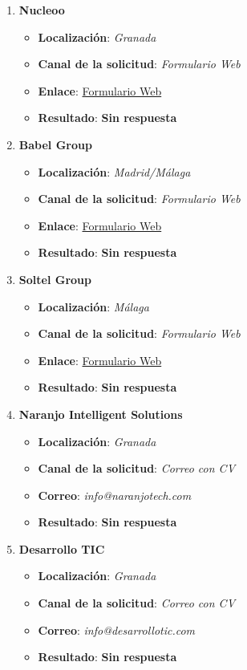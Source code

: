 \begin{enumerate}
	\item \textbf{Nucleoo}
	\begin{itemize}
		\item \textbf{Localización}: \textit{Granada}
		\item \textbf{Canal de la solicitud}: \textit{Formulario Web}
		\item \textbf{Enlace}: \href{https://nucleoo.factorialhr.es/apply}{Formulario Web}
		\item \textbf{Resultado}: {\color{orange} \textbf{Sin respuesta}}
	\end{itemize}
	 \item \textbf{Babel Group}
	\begin{itemize}
		\item \textbf{Localización}: \textit{Madrid/Málaga}
		\item \textbf{Canal de la solicitud}: \textit{Formulario Web}
		\item \textbf{Enlace}: \href{https://babelgroup.wd103.myworkdayjobs.com/es/REC_External_Career_Site/job/Prcticas-FPGS---Software-Engineer--Infrastructure-Technician_JR102635}{Formulario Web}
		\item \textbf{Resultado}: {\color{orange} \textbf{Sin respuesta}}
	\end{itemize}
	 \item \textbf{Soltel Group}
	\begin{itemize}
		\item \textbf{Localización}: \textit{Málaga}
		\item \textbf{Canal de la solicitud}: \textit{Formulario Web}
		\item \textbf{Enlace}: \href{https://www.soltel.es/unete-a-nosotros/}{Formulario Web}
		\item \textbf{Resultado}: {\color{orange} \textbf{Sin respuesta}}
	\end{itemize}
    \item \textbf{Naranjo Intelligent Solutions}
	\begin{itemize}
		\item \textbf{Localización}: \textit{Granada}
		\item \textbf{Canal de la solicitud}: \textit{Correo con CV}
		\item \textbf{Correo}: \textit{info@naranjotech.com}
		\item \textbf{Resultado}: {\color{orange} \textbf{Sin respuesta}}
	\end{itemize}
	\item \textbf{Desarrollo TIC}
	\begin{itemize}
		\item \textbf{Localización}: \textit{Granada}
		\item \textbf{Canal de la solicitud}: \textit{Correo con CV}
		\item \textbf{Correo}: \textit{info@desarrollotic.com}
		\item \textbf{Resultado}: {\color{orange} \textbf{Sin respuesta}}
	\end{itemize}
\end{enumerate}







%

